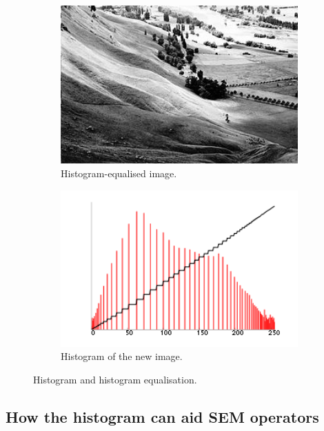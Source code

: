\documentclass[12pt, twocolumn]{report}
\begin{document}
\begin{figure}[htbp]
\begin{subfigure}{0.4\textwidth}
        \includegraphics[width=1\textwidth]{Figures/Histogram equalisation final image.jpg}
        \caption{Histogram-equalised image.}
        \label{Histogram equalisation final image}
    \end{subfigure}
    \begin{subfigure}{0.4\textwidth}
        \centering
        \includegraphics[width=1\textwidth]{Figures/Histogram equalisation final image histogram.png}
        \caption{Histogram of the new image.}
        \label{Histogram equalisation final image histogram}
    \end{subfigure}
    \caption{Histogram and histogram equalisation.}
    \label{Histogram and histogram equalisation}
\end{figure}

\subsection{How the histogram can aid SEM operators}
\end{document}
